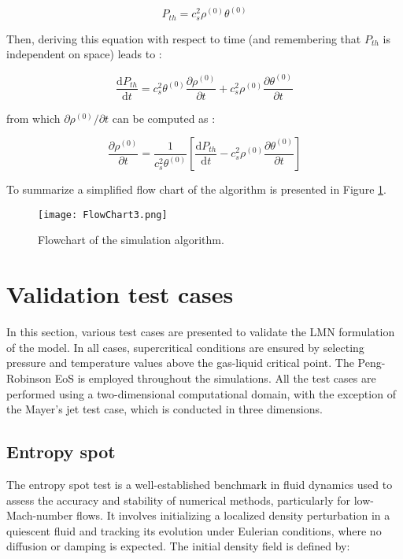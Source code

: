 \begin{equation}
    P_{th} = c_s^2 \rho^{(0)} \theta^{(0)}
\end{equation}

Then, deriving this equation with respect to time (and remembering that $P_{th}$
is independent on space) leads to :

\begin{equation}
    \frac{\mathrm{d} P_{th}}{\mathrm{d} t} = c_s^2 \theta^{(0)} \frac{\partial \rho^{(0)}}{\partial t}+ c_s^2 \rho^{(0)} \frac{\partial \theta^{(0)}}{\partial t}
\end{equation}

from which $\partial \rho^{(0)} / \partial t$ can be computed as :

\begin{equation}
    \frac{\partial \rho^{(0)}}{\partial t} = \frac{1}{c_s^2 \theta^{(0)}} \left[ \frac{\mathrm{d} P_{th}}{\mathrm{d} t} - c_s^2 \rho^{(0)} \frac{\partial \theta^{(0)}}{\partial t} \right]
\end{equation}

\hspace{2cm}

To summarize a simplified flow chart of the algorithm is presented in Figure
\ref{Flow Chart}.

\begin{figure}[ht!]
\centering
\texttt{[image: FlowChart3.png]}
\caption{Flowchart of the simulation algorithm.}
\label{Flow Chart}
\end{figure}

\section{Validation test cases}

In this section, various test cases are presented to validate the LMN
formulation of the model. In all cases, supercritical conditions are ensured by
selecting pressure and temperature values above the gas-liquid critical point.
The Peng-Robinson EoS is employed throughout the simulations. All the test cases
are performed using a two-dimensional computational domain, with the exception
of the Mayer’s jet test case, which is conducted in three dimensions.

\subsection{Entropy spot}
The entropy spot test is a well-established benchmark in fluid dynamics used to
assess the accuracy and stability of numerical methods, particularly for
low-Mach-number flows. It involves initializing a localized density perturbation
in a quiescent fluid and tracking its evolution under Eulerian conditions, where
no diffusion or damping is expected. The initial density field is defined by:


